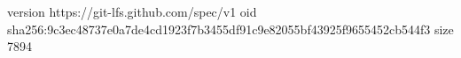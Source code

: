 version https://git-lfs.github.com/spec/v1
oid sha256:9c3ec48737e0a7de4cd1923f7b3455df91c9e82055bf43925f9655452cb544f3
size 7894
